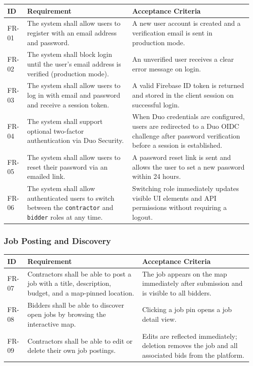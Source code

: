 \documentclass[11pt]{article}
\begin{document}
\begin{longtable}{@{}p{1.8cm}p{5.8cm}p{5.8cm}@{}}
\toprule
\textbf{ID} & \textbf{Requirement} & \textbf{Acceptance Criteria} \\
\midrule
\endhead
FR-01 & The system shall allow users to register with an email address and password. & A new user account is created and a verification email is sent in production mode. \\
\midrule
FR-02 & The system shall block login until the user's email address is verified (production mode). & An unverified user receives a clear error message on login. \\
\midrule
FR-03 & The system shall allow users to log in with email and password and receive a session token. & A valid Firebase ID token is returned and stored in the client session on successful login. \\
\midrule
FR-04 & The system shall support optional two-factor authentication via Duo Security. & When Duo credentials are configured, users are redirected to a Duo OIDC challenge after password verification before a session is established. \\
\midrule
FR-05 & The system shall allow users to reset their password via an emailed link. & A password reset link is sent and allows the user to set a new password within 24 hours. \\
\midrule
FR-06 & The system shall allow authenticated users to switch between the \texttt{contractor} and \texttt{bidder} roles at any time. & Switching role immediately updates visible UI elements and API permissions without requiring a logout. \\
\bottomrule
\end{longtable}

\subsubsection{Job Posting and Discovery}

\begin{longtable}{@{}p{1.8cm}p{5.8cm}p{5.8cm}@{}}
\toprule
\textbf{ID} & \textbf{Requirement} & \textbf{Acceptance Criteria} \\
\midrule
\endhead
FR-07 & Contractors shall be able to post a job with a title, description, budget, and a map-pinned location. & The job appears on the map immediately after submission and is visible to all bidders. \\
\midrule
FR-08 & Bidders shall be able to discover open jobs by browsing the interactive map. & Clicking a job pin opens a job detail view. \\
\midrule
FR-09 & Contractors shall be able to edit or delete their own job postings. & Edits are reflected immediately; deletion removes the job and all associated bids from the platform. \\
\bottomrule
\end{longtable}
\end{document}
